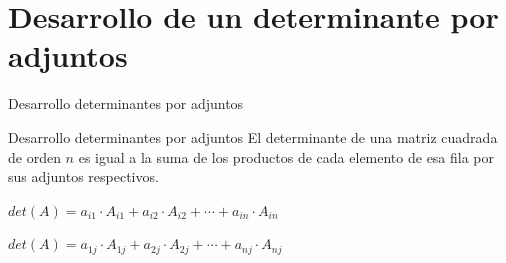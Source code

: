 \documentclass[9pt]{beamer}
\begin{document}
\section{Desarrollo de un determinante por adjuntos}
\begin{frame}{Desarrollo determinantes por adjuntos}
\begin{alertblock}{Desarrollo determinantes por adjuntos}
El determinante de una matriz cuadrada de orden $n$ es igual a la suma de los productos de cada elemento de esa fila por sus adjuntos respectivos.

$det(A)= a_{i1}\cdot A_{i1}+a_{i2}\cdot A_{i2}+\cdots +a_{in}\cdot A_{in}$

$det(A)= a_{1j}\cdot A_{1j}+a_{2j}\cdot A_{2j}+\cdots +a_{nj}\cdot A_{nj}$
\end{alertblock}
\end{frame}
\end{document}
